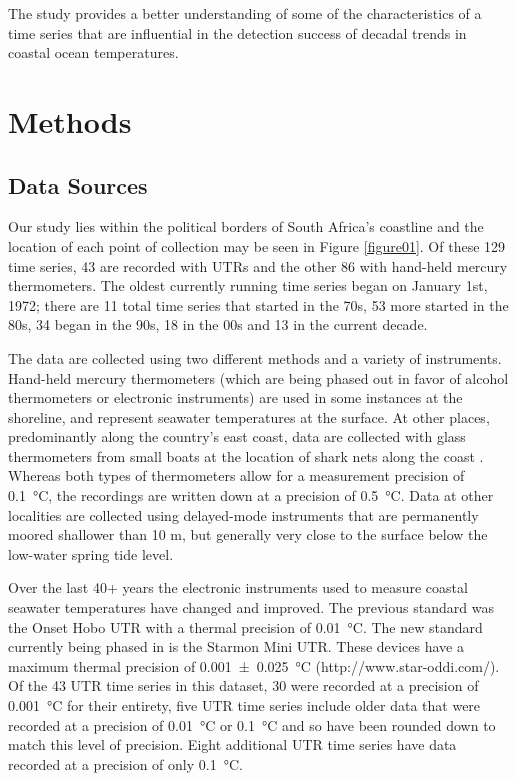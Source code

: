 \documentclass[]{ametsoc}
\begin{document}
The study provides a better understanding of some of the characteristics of a time series that are influential in the detection success of decadal trends in coastal ocean temperatures.

\section{Methods}

\subsection{Data Sources}
Our study lies within the political borders of South Africa's coastline and the location of each point of collection may be seen in Figure \ref{figure01}. Of these 129 time series, 43 are recorded with UTRs and the other 86 with hand-held mercury thermometers. The oldest currently running time series began on January 1st, 1972; there are 11 total time series that started in the 70s, 53 more started in the 80s, 34 began in the 90s, 18 in the 00s and 13 in the current decade.

The data are collected using two different methods and a variety of instruments. Hand-held mercury thermometers (which are being phased out in favor of alcohol thermometers or electronic instruments) are used in some instances at the shoreline, and represent seawater temperatures at the surface. At other places, predominantly along the country's east coast, data are collected with glass thermometers from small boats at the location of shark nets along the coast \citep{Cliff1988}. Whereas both types of thermometers allow for a measurement precision of \SI{0.1}{\degreeCelsius}, the recordings are written down at a precision of \SI{0.5}{\degreeCelsius}. Data at other localities are collected using delayed-mode instruments that are permanently moored shallower than 10 m, but generally very close to the surface below the low-water spring tide level.

Over the last 40+ years the electronic instruments used to measure coastal seawater temperatures have changed and improved. The previous standard was the Onset Hobo UTR with a thermal precision of \SI{0.01}{\degreeCelsius}. The new standard currently being phased in is the Starmon Mini UTR. These devices have a maximum thermal precision of \SI[separate-uncertainty = true, multi-part-units = repeat]{0.001(25)}{\degreeCelsius} (http://www.star-oddi.com/). Of the 43 UTR time series in this dataset, 30 were recorded at a precision of \SI{0.001}{\degreeCelsius} for their entirety, five UTR time series include older data that were recorded at a precision of \SI{0.01}{\degreeCelsius} or \SI{0.1}{\degreeCelsius} and so have been rounded down to match this level of precision. Eight additional UTR time series have data recorded at a precision of only \SI{0.1}{\degreeCelsius}.
\end{document}
